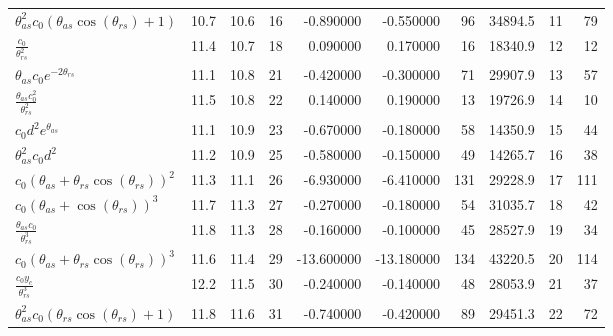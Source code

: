 \begin{tabularx}{\textwidth}{lllrrrrlrr}
$ \theta_{as}^{2} c_{0} \left(\theta_{as} \cos{\left(\theta_{rs} \right)} + 1\right) $  &  10.7  &  10.6  &  16  &  -0.890000  &  -0.550000  &  96  &  34894.5  &  11\phantom{.000000}  &  79\phantom{.000000}  \\ 
$ \displaystyle\frac{c_{0}}{\theta_{rs}^{2}} $  &  11.4  &  10.7  &  18  &  0.090000  &  0.170000  &  16  &  18340.9  &  12\phantom{.000000}  &  12\phantom{.000000}  \\ 
$ \theta_{as} c_{0} e^{- 2 \theta_{rs}} $  &  11.1  &  10.8  &  21  &  -0.420000  &  -0.300000  &  71  &  29907.9  &  13\phantom{.000000}  &  57\phantom{.000000}  \\ 
$ \displaystyle\frac{\theta_{as} c_{0}^{2}}{\theta_{rs}^{2}} $  &  11.5  &  10.8  &  22  &  0.140000  &  0.190000  &  13  &  19726.9  &  14\phantom{.000000}  &  10\phantom{.000000}  \\ 
$ c_{0} d^{2} e^{\theta_{as}} $  &  11.1  &  10.9  &  23  &  -0.670000  &  -0.180000  &  58  &  14350.9  &  15\phantom{.000000}  &  44\phantom{.000000}  \\ 
$ \theta_{as}^{2} c_{0} d^{2} $  &  11.2  &  10.9  &  25  &  -0.580000  &  -0.150000  &  49  &  14265.7  &  16\phantom{.000000}  &  38\phantom{.000000}  \\ 
$ c_{0} \left(\theta_{as} + \theta_{rs} \cos{\left(\theta_{rs} \right)}\right)^{2} $  &  11.3  &  11.1  &  26  &  -6.930000  &  -6.410000  &  131  &  29228.9  &  17\phantom{.000000}  &  111\phantom{.000000}  \\ 
$ c_{0} \left(\theta_{as} + \cos{\left(\theta_{rs} \right)}\right)^{3} $  &  11.7  &  11.3  &  27  &  -0.270000  &  -0.180000  &  54  &  31035.7  &  18\phantom{.000000}  &  42\phantom{.000000}  \\ 
$ \displaystyle\frac{\theta_{as} c_{0}}{\theta_{rs}^{3}} $  &  11.8  &  11.3  &  28  &  -0.160000  &  -0.100000  &  45  &  28527.9  &  19\phantom{.000000}  &  34\phantom{.000000}  \\ 
$ c_{0} \left(\theta_{as} + \theta_{rs} \cos{\left(\theta_{rs} \right)}\right)^{3} $  &  11.6  &  11.4  &  29  &  -13.600000  &  -13.180000  &  134  &  43220.5  &  20\phantom{.000000}  &  114\phantom{.000000}  \\ 
$ \displaystyle\frac{c_{0} y_c}{\theta_{rs}^{3}} $  &  12.2  &  11.5  &  30  &  -0.240000  &  -0.140000  &  48  &  28053.9  &  21\phantom{.000000}  &  37\phantom{.000000}  \\ 
$ \theta_{as}^{2} c_{0} \left(\theta_{rs} \cos{\left(\theta_{rs} \right)} + 1\right) $  &  11.8  &  11.6  &  31  &  -0.740000  &  -0.420000  &  89  &  29451.3  &  22\phantom{.000000}  &  72\phantom{.000000}  \\ 

\end{tabularx}

